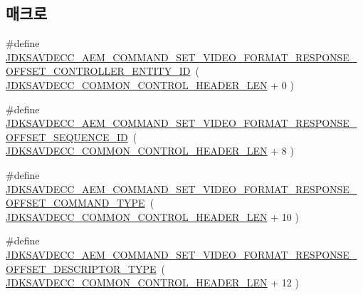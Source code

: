 \subsection*{매크로}
\begin{DoxyCompactItemize}
\item 
\#define \hyperlink{group__command__set__video__format__response_ga41f0874b58c46a80b043f0860a6230ec}{J\+D\+K\+S\+A\+V\+D\+E\+C\+C\+\_\+\+A\+E\+M\+\_\+\+C\+O\+M\+M\+A\+N\+D\+\_\+\+S\+E\+T\+\_\+\+V\+I\+D\+E\+O\+\_\+\+F\+O\+R\+M\+A\+T\+\_\+\+R\+E\+S\+P\+O\+N\+S\+E\+\_\+\+O\+F\+F\+S\+E\+T\+\_\+\+C\+O\+N\+T\+R\+O\+L\+L\+E\+R\+\_\+\+E\+N\+T\+I\+T\+Y\+\_\+\+ID}~( \hyperlink{group__jdksavdecc__avtp__common__control__header_gaae84052886fb1bb42f3bc5f85b741dff}{J\+D\+K\+S\+A\+V\+D\+E\+C\+C\+\_\+\+C\+O\+M\+M\+O\+N\+\_\+\+C\+O\+N\+T\+R\+O\+L\+\_\+\+H\+E\+A\+D\+E\+R\+\_\+\+L\+EN} + 0 )
\item 
\#define \hyperlink{group__command__set__video__format__response_ga4e2df875f1850a6f00262f143c6d1288}{J\+D\+K\+S\+A\+V\+D\+E\+C\+C\+\_\+\+A\+E\+M\+\_\+\+C\+O\+M\+M\+A\+N\+D\+\_\+\+S\+E\+T\+\_\+\+V\+I\+D\+E\+O\+\_\+\+F\+O\+R\+M\+A\+T\+\_\+\+R\+E\+S\+P\+O\+N\+S\+E\+\_\+\+O\+F\+F\+S\+E\+T\+\_\+\+S\+E\+Q\+U\+E\+N\+C\+E\+\_\+\+ID}~( \hyperlink{group__jdksavdecc__avtp__common__control__header_gaae84052886fb1bb42f3bc5f85b741dff}{J\+D\+K\+S\+A\+V\+D\+E\+C\+C\+\_\+\+C\+O\+M\+M\+O\+N\+\_\+\+C\+O\+N\+T\+R\+O\+L\+\_\+\+H\+E\+A\+D\+E\+R\+\_\+\+L\+EN} + 8 )
\item 
\#define \hyperlink{group__command__set__video__format__response_ga0af3abb14db6b93a5ee6d0a2976e338e}{J\+D\+K\+S\+A\+V\+D\+E\+C\+C\+\_\+\+A\+E\+M\+\_\+\+C\+O\+M\+M\+A\+N\+D\+\_\+\+S\+E\+T\+\_\+\+V\+I\+D\+E\+O\+\_\+\+F\+O\+R\+M\+A\+T\+\_\+\+R\+E\+S\+P\+O\+N\+S\+E\+\_\+\+O\+F\+F\+S\+E\+T\+\_\+\+C\+O\+M\+M\+A\+N\+D\+\_\+\+T\+Y\+PE}~( \hyperlink{group__jdksavdecc__avtp__common__control__header_gaae84052886fb1bb42f3bc5f85b741dff}{J\+D\+K\+S\+A\+V\+D\+E\+C\+C\+\_\+\+C\+O\+M\+M\+O\+N\+\_\+\+C\+O\+N\+T\+R\+O\+L\+\_\+\+H\+E\+A\+D\+E\+R\+\_\+\+L\+EN} + 10 )
\item 
\#define \hyperlink{group__command__set__video__format__response_ga4696716c04d68316a5949c4e9593802d}{J\+D\+K\+S\+A\+V\+D\+E\+C\+C\+\_\+\+A\+E\+M\+\_\+\+C\+O\+M\+M\+A\+N\+D\+\_\+\+S\+E\+T\+\_\+\+V\+I\+D\+E\+O\+\_\+\+F\+O\+R\+M\+A\+T\+\_\+\+R\+E\+S\+P\+O\+N\+S\+E\+\_\+\+O\+F\+F\+S\+E\+T\+\_\+\+D\+E\+S\+C\+R\+I\+P\+T\+O\+R\+\_\+\+T\+Y\+PE}~( \hyperlink{group__jdksavdecc__avtp__common__control__header_gaae84052886fb1bb42f3bc5f85b741dff}{J\+D\+K\+S\+A\+V\+D\+E\+C\+C\+\_\+\+C\+O\+M\+M\+O\+N\+\_\+\+C\+O\+N\+T\+R\+O\+L\+\_\+\+H\+E\+A\+D\+E\+R\+\_\+\+L\+EN} + 12 )

\end{DoxyCompactItemize}
